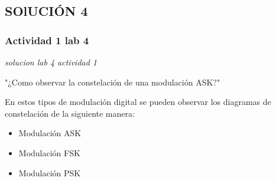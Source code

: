 \subsection{SOlUCIÓN 4}

\subsubsection{Actividad 1 lab 4}
\begin{frame}{}


\begin{block}{}
	\centering
	\vspace{1mm}
	\large{\textit{solucion lab 4 actividad 1}}
	\vspace{1mm}
\end{block}
\end{frame}


\begin{frame}{"¿Como observar la constelación de una modulación ASK?"}
\begin{flushleft}
En estos tipos de modulación digital se pueden observar los diagramas de constelación de la siguiente manera:
\end{flushleft}
\begin{itemize}
  \item {Modulación ASK}
  \item {Modulación FSK}
  \item {Modulación PSK}
\end{itemize}
\end{frame}

